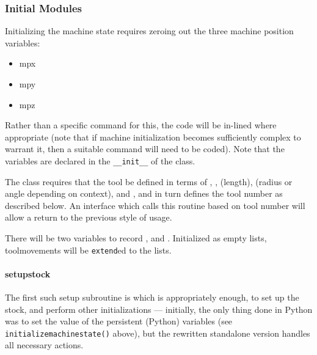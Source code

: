 \documentclass{ltxdoc}
\begin{document}

\subsubsection{Initial Modules}

Initializing the machine state requires zeroing out the three machine position variables:

\begin{itemize}
\item mpx
\item mpy
\item mpz
\end{itemize}

\noindent Rather than a specific command for this, the code will be in-lined where appropriate (note that if machine initialization becomes sufficiently complex to warrant it, then a suitable command will need to be coded). Note that the variables are declared in the \verb|__init__| of the class.

The  class requires that the tool be defined in terms of , ,  (length),  (radius or angle depending on context), and , and in turn defines the tool number as described below. An interface which calls this routine based on tool number will allow a return to the previous style of usage.

There will be two variables to record ,  and . Initialized as empty lists, toolmovements will be \verb|extend|ed to the lists.

\paragraph{setupstock}

The first such setup subroutine is   which is appropriately enough, to set up the stock, and perform other initializations --- initially, the only thing done in Python was to set the value of the persistent (Python) variables (see \verb|initializemachinestate()| above), but the rewritten standalone version handles all necessary actions.
\end{document}
